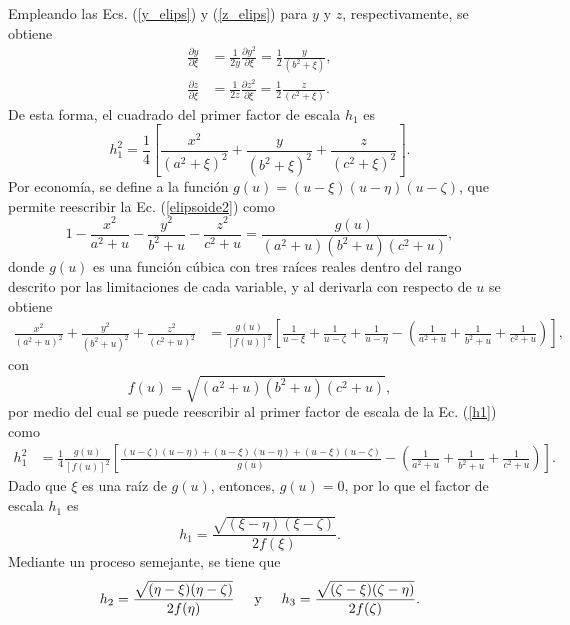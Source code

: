Empleando las Ecs. (\ref{y_elips}) y (\ref{z_elips}) para $y$ y $z$, respectivamente, se obtiene
\begin{align*}
	\frac{\partial y}{\partial \xi}&=\frac{1}{2y}\frac{\partial y^2}{\partial\xi}=\frac{1}{2}\frac{y}{(b^2+\xi)},\\
	\frac{\partial z}{\partial \xi}&=\frac{1}{2z}\frac{\partial z^2}{\partial\xi}=\frac{1}{2}\frac{z}{(c^2+\xi)}.
\end{align*}
De esta forma, el cuadrado del primer factor de escala $h_1$ es
\begin{equation}
	h_1^2=\frac{1}{4}\left[\frac{x^2}{(a^2+\xi)^2}+\frac{y}{(b^2+\xi)^2}+\frac{z}{(c^2+\xi)^2}\right].
	\label{h1}
\end{equation}
Por economía, se define a la función $g(u)=(u-\xi)(u-\eta)(u-\zeta)$, que permite reescribir la Ec. (\ref{elipsoide2}) como
\begin{equation}
	1-\frac{x^2}{a^2+u}-\frac{y^2}{b^2+u}-\frac{z^2}{c^2+u}=\frac{g(u)}{(a^2+u)(b^2+u)(c^2+u)},
\end{equation}
donde $g(u)$ es una función cúbica con tres raíces reales dentro del rango descrito por las limitaciones de cada variable, y al  derivarla con respecto de $u$ se obtiene
\begin{align}
	\frac{x^2}{(a^2+u)^2}+\frac{y^2}{(b^2+u)^2}+\frac{z^2}{(c^2+u)^2}&=\frac{g(u)}{[f(u)]^2}\left[\frac{1}{u-\xi}+\frac{1}{u-\zeta}+\frac{1}{u-\eta}-\left(\frac{1}{a^2+u}+\frac{1}{b^2+u}+\frac{1}{c^2+u}\right)\right],
\end{align}
con 
\begin{equation}
	f(u)=\sqrt{(a^2+u)(b^2+u)(c^2+u)},  
\end{equation}
por medio del cual se puede reescribir al primer factor de escala de la Ec. (\ref{h1}) como
\begin{align*}
	h_1^2&=\frac{1}{4}\frac{g(u)}{[f(u)]^2}\left[\frac{(u-\zeta)(u-\eta)+(u-\xi)(u-\eta)+(u-\xi)(u-\zeta)}{g(u)}-\left(\frac{1}{a^2+u}+\frac{1}{b^2+u}+\frac{1}{c^2+u}\right)\right].    
\end{align*}
Dado que $\xi$ es una raíz de $g(u)$, entonces, $g(u)=0$, por lo que el factor de escala $h_1$ es
\begin{equation}
	h_1=\frac{\sqrt{(\xi-\eta)(\xi-\zeta)}}{2f(\xi)}.
	\label{h1}
\end{equation}
Mediante un proceso semejante, se tiene que
\begin{equation}
	h_2=\frac{\sqrt{(\eta-\xi)(\eta-\zeta)}}{2f(\eta)}\hspace{0.5cm}\mbox{y}\hspace{0.5cm}
	h_3=\frac{\sqrt{(\zeta-\xi)(\zeta-\eta)}}{2f(\zeta)}.
	\label{h2yh3}
\end{equation}
